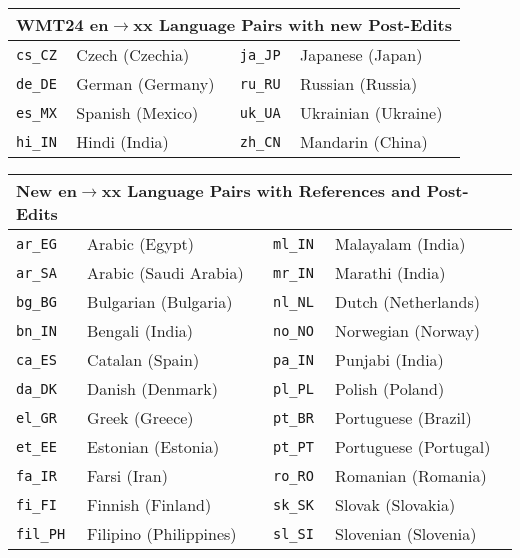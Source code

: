 \begin{table}[t!]
    \centering
    \begin{adjustbox}{width=\columnwidth}
    \begin{tabular}{ll|ll}
        \toprule
        \multicolumn{4}{l}{\bf WMT24 en$\rightarrow$xx Language Pairs with new Post-Edits} \\ 
        \midrule
\texttt{cs\_CZ} & Czech (Czechia) & \texttt{ja\_JP} & Japanese (Japan) \\
\texttt{de\_DE} & German (Germany) & \texttt{ru\_RU} & Russian (Russia) \\
\texttt{es\_MX} & Spanish (Mexico) & \texttt{uk\_UA} & Ukrainian (Ukraine) \\
\texttt{hi\_IN} & Hindi (India) & \texttt{zh\_CN} & Mandarin (China) \\
\bottomrule
    \end{tabular}
    \end{adjustbox}
    \newline
    \vspace*{0.1cm}
    \begin{adjustbox}{width=\columnwidth}
    \begin{tabular}{ll|ll}
        \toprule
        \multicolumn{4}{l}{\bf New en$\rightarrow$xx Language Pairs with References and Post-Edits} \\ 
        \midrule
\texttt{ar\_EG} & Arabic (Egypt) & \texttt{ml\_IN} & Malayalam (India) \\
\texttt{ar\_SA} & Arabic (Saudi Arabia) & \texttt{mr\_IN} & Marathi (India) \\
\texttt{bg\_BG} & Bulgarian (Bulgaria) & \texttt{nl\_NL} & Dutch (Netherlands) \\
\texttt{bn\_IN} & Bengali (India) & \texttt{no\_NO} & Norwegian (Norway) \\
\texttt{ca\_ES} & Catalan (Spain) & \texttt{pa\_IN} & Punjabi (India) \\
\texttt{da\_DK} & Danish (Denmark) & \texttt{pl\_PL} & Polish (Poland) \\
\texttt{el\_GR} & Greek (Greece) & \texttt{pt\_BR} & Portuguese (Brazil) \\
\texttt{et\_EE} & Estonian (Estonia) & \texttt{pt\_PT} & Portuguese (Portugal) \\
\texttt{fa\_IR} & Farsi (Iran) & \texttt{ro\_RO} & Romanian (Romania) \\
\texttt{fi\_FI} & Finnish (Finland) & \texttt{sk\_SK} & Slovak (Slovakia) \\
\texttt{fil\_PH} & Filipino (Philippines) & \texttt{sl\_SI} & Slovenian (Slovenia) \\

\end{tabular}
\end{adjustbox}
\end{table}
